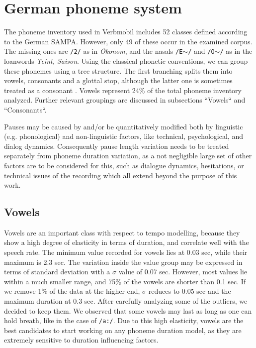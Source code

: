 \documentclass[11pt,a4paper]{scrbook}
\begin{document}
\chapter{German phoneme system}
\label{chap_phonemes}
The phoneme inventory used in Verbmobil includes 52 classes defined according to the German SAMPA. However, only 49 of these occur in the examined corpus. The missing ones are \texttt{/2/} as in \textit{Ökonom}, and the nasals \texttt{/E$\sim$/} and \texttt{/O$\sim$/} as in the loanwords \textit{Teint, Saison}. Using the classical phonetic conventions, we can group these phonemes using a tree structure. The first branching splits them into vowels, consonants and a glottal stop, although the latter one is sometimes treated as a consonant \cite{Kohler1995}. Vowels represent 24\% of the total phoneme inventory analyzed. Further relevant groupings are discussed in subsections ``Vowels`` and ``Consonants``.

Pauses may be caused by and/or be quantitatively modified both by linguistic (e.g. phonological) and non-linguistic factors, like technical, psychological, and dialog dynamics. Consequently pause length variation needs to be treated separately from phoneme duration variation, as a not negligible large set of other factors are to be considered for this, such as dialogue dynamics, hesitations, or technical issues of the recording which all extend beyond the purpose of this work.

\section{Vowels}
Vowels are an important class with respect to tempo modelling, because they show a high degree of elasticity in terms of duration, and correlate well with the speech rate. The minimum value recorded for vowels lies at 0.03 sec, while their maximum is 2.3 sec. The variation inside the value group may be expressed in terms of standard deviation with a $\sigma$ value of 0.07 sec. However, most values lie within a much smaller range, and 75\% of the vowels are shorter than 0.1 sec. If we remove 1\% of the data at the higher end, $\sigma$ reduces to 0.05 sec and the maximum duration at 0.3 sec. After carefully analyzing some of the outliers, we decided to keep them. We observed that some vowels may last as long as one can hold breath, like in the case of \texttt{/a:/}. Due to this high elasticity, vowels are the best candidates to start working on any phoneme duration model, as they are extremely sensitive to duration influencing factors. 
\end{document}
